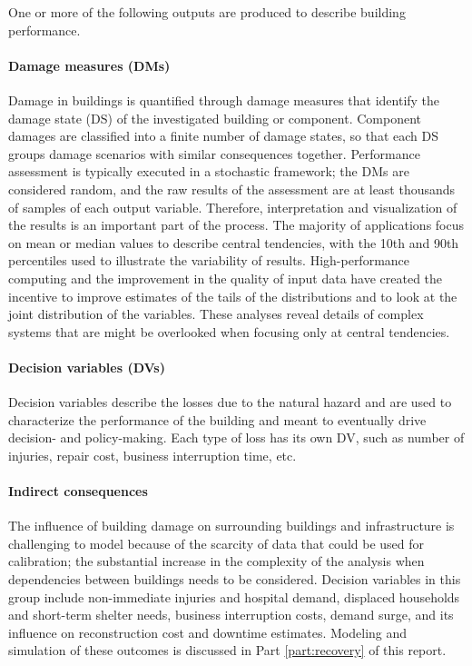 \noindent One or more of the following outputs are produced to describe building performance.

\paragraph{Damage measures (DMs)} Damage in buildings is quantified through damage measures that identify the damage state (DS) of the investigated building or component. Component damages are classified into a finite number of damage states, so that each DS groups damage scenarios with similar consequences together. Performance assessment is typically executed in a stochastic framework; the DMs are considered random, and the raw results of the assessment are at least thousands of samples of each output variable. Therefore, interpretation and visualization of the results is an important part of the process. The majority of applications focus on mean or median values to describe central tendencies, with the 10th and 90th percentiles used to illustrate the variability of results. High-performance computing and the improvement in the quality of input data have created the incentive to improve estimates of the tails of the distributions and to look at the joint distribution of the variables. These analyses reveal details of complex systems that are might be overlooked when focusing only at central tendencies.

\paragraph{Decision variables (DVs)} Decision variables describe the losses due to the natural hazard and are used to characterize the performance of the building and meant to eventually drive decision- and policy-making. Each type of loss has its own DV, such as number of injuries, repair cost, business interruption time, etc.

\paragraph{Indirect consequences} The influence of building damage on surrounding buildings and infrastructure is challenging to model because of the scarcity of data that could be used for calibration; the substantial increase in the complexity of the analysis when dependencies between buildings needs to be considered. Decision variables in this group include non-immediate injuries and hospital demand, displaced households and short-term shelter needs, business interruption costs, demand surge, and its influence on reconstruction cost and downtime estimates. Modeling and simulation of these  outcomes is discussed in Part \ref{part:recovery} of this report.

